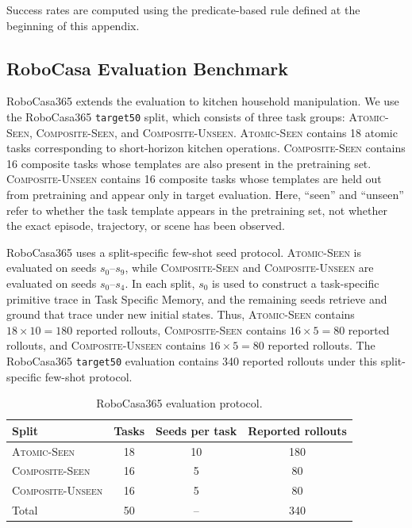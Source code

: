 \documentclass{article}
\begin{document}
Success rates are computed using the predicate-based rule defined at the beginning of this appendix.

\subsection{RoboCasa Evaluation Benchmark}
\label{app:benchmark:robocasa}

RoboCasa365 extends the evaluation to kitchen household manipulation. We use the RoboCasa365 \texttt{target50} split, which consists of three task groups: \textsc{Atomic-Seen}, \textsc{Composite-Seen}, and \textsc{Composite-Unseen}. \textsc{Atomic-Seen} contains 18 atomic tasks corresponding to short-horizon kitchen operations. \textsc{Composite-Seen} contains 16 composite tasks whose templates are also present in the pretraining set. \textsc{Composite-Unseen} contains 16 composite tasks whose templates are held out from pretraining and appear only in target evaluation. Here, ``seen'' and ``unseen'' refer to whether the task template appears in the pretraining set, not whether the exact episode, trajectory, or scene has been observed.

RoboCasa365 uses a split-specific few-shot seed protocol. \textsc{Atomic-Seen} is evaluated on seeds $s_0$--$s_9$, while \textsc{Composite-Seen} and \textsc{Composite-Unseen} are evaluated on seeds $s_0$--$s_4$. In each split, $s_0$ is used to construct a task-specific primitive trace in Task Specific Memory, and the remaining seeds retrieve and ground that trace under new initial states. Thus, \textsc{Atomic-Seen} contains $18 \times 10 = 180$ reported rollouts, \textsc{Composite-Seen} contains $16 \times 5 = 80$ reported rollouts, and \textsc{Composite-Unseen} contains $16 \times 5 = 80$ reported rollouts. The RoboCasa365 \texttt{target50} evaluation contains 340 reported rollouts under this split-specific few-shot protocol.

\begin{table}[h]
    \centering
    \caption{RoboCasa365 evaluation protocol.}
    \label{tab:app_robocasa_protocol}
    \begin{tabular}{lccc}
        \toprule
        Split & Tasks & Seeds per task & Reported rollouts \\
        \midrule
        \textsc{Atomic-Seen}      & 18 & 10 & 180 \\
        \textsc{Composite-Seen}   & 16 & 5 & 80 \\
        \textsc{Composite-Unseen} & 16 & 5 & 80 \\
        \midrule
        Total & 50 & -- & 340 \\
        \bottomrule
    \end{tabular}
\end{table}
\end{document}
